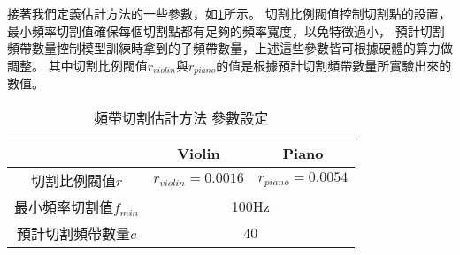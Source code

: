 \documentclass[class=NCU_thesis, crop=false]{standalone}
\begin{document}
接著我們定義估計方法的一些參數，如\cref{table:table-estimate-band-split-parameter-setting}所示。
切割比例閥值控制切割點的設置，最小頻率切割值確保每個切割點都有足夠的頻率寬度，以免特徵過小，
預計切割頻帶數量控制模型訓練時拿到的子頻帶數量，上述這些參數皆可根據硬體的算力做調整。
其中切割比例閥值$r_{violin}$與$r_{piano}$的值是根據預計切割頻帶數量所實驗出來的數值。
\begin{table}[h]
    \centering
    \caption{頻帶切割估計方法 參數設定}
    \label{table:table-estimate-band-split-parameter-setting}
    \begin{tabular}{|c|c|c|}
        \hline
        \multicolumn{1}{|c|}{} & \multicolumn{1}{|c|}{Violin} & \multicolumn{1}{|c|}{Piano}\\
        \hline
        切割比例閥值$r$ & $r_{violin}=0.0016$ & $r_{piano}=0.0054$ \\
        \hline
        最小頻率切割值$f_{min}$ & \multicolumn{2}{|c|}{100Hz} \\
        \hline
        預計切割頻帶數量$c$ & \multicolumn{2}{|c|}{40} \\
        \hline
    \end{tabular}
\end{table}
\end{document}
